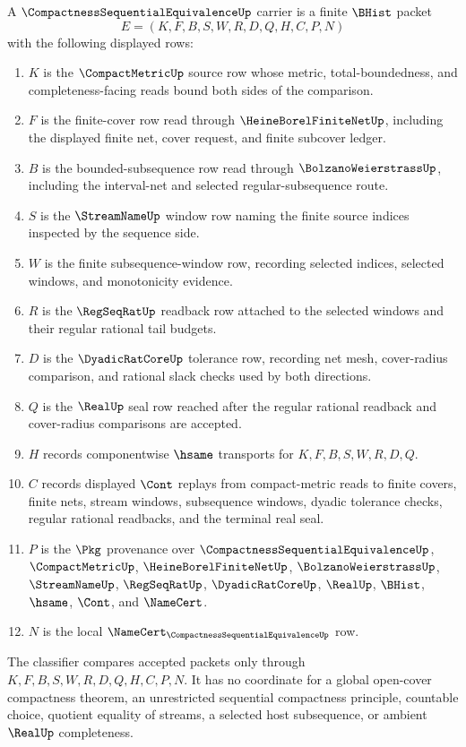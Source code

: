 \begin{definition}
\label{def:compactness-sequential-equivalence-carrier}
A $\CompactnessSequentialEquivalenceUp$ carrier is a finite $\BHist$ packet
$$
E=(K,F,B,S,W,R,D,Q,H,C,P,N)
$$
with the following displayed rows:
\begin{enumerate}
\item $K$ is the $\CompactMetricUp$ source row whose metric, total-boundedness, and completeness-facing reads bound both sides of the comparison.
\item $F$ is the finite-cover row read through $\HeineBorelFiniteNetUp$, including the displayed finite net, cover request, and finite subcover ledger.
\item $B$ is the bounded-subsequence row read through $\BolzanoWeierstrassUp$, including the interval-net and selected regular-subsequence route.
\item $S$ is the $\StreamNameUp$ window row naming the finite source indices inspected by the sequence side.
\item $W$ is the finite subsequence-window row, recording selected indices, selected windows, and monotonicity evidence.
\item $R$ is the $\RegSeqRatUp$ readback row attached to the selected windows and their regular rational tail budgets.
\item $D$ is the $\DyadicRatCoreUp$ tolerance row, recording net mesh, cover-radius comparison, and rational slack checks used by both directions.
\item $Q$ is the $\RealUp$ seal row reached after the regular rational readback and cover-radius comparisons are accepted.
\item $H$ records componentwise $\hsame$ transports for $K,F,B,S,W,R,D,Q$.
\item $C$ records displayed $\Cont$ replays from compact-metric reads to finite covers, finite nets, stream windows, subsequence windows, dyadic tolerance checks, regular rational readbacks, and the terminal real seal.
\item $P$ is the $\Pkg$ provenance over $\CompactnessSequentialEquivalenceUp$, $\CompactMetricUp$, $\HeineBorelFiniteNetUp$, $\BolzanoWeierstrassUp$, $\StreamNameUp$, $\RegSeqRatUp$, $\DyadicRatCoreUp$, $\RealUp$, $\BHist$, $\hsame$, $\Cont$, and $\NameCert$.
\item $N$ is the local $\NameCert_{\CompactnessSequentialEquivalenceUp}$ row.
\end{enumerate}
The classifier compares accepted packets only through $K,F,B,S,W,R,D,Q,H,C,P,N$. It has no coordinate for a global open-cover compactness theorem, an unrestricted sequential compactness principle, countable choice, quotient equality of streams, a selected host subsequence, or ambient $\RealUp$ completeness.
\end{definition}

